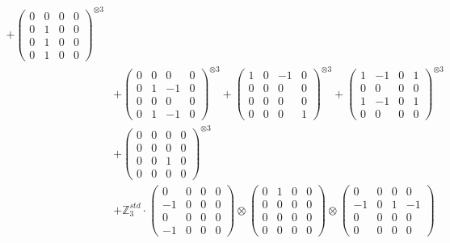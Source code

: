 \documentclass{article}
\begin{document}
{\begin{align}
            + \begin{pmatrix} 0 & 0 & 0 & 0 \\ 0 & 1 & 0 & 0 \\ 0 & 1 & 0 & 0 \\ 0 & 1 & 0 & 0 \end{pmatrix}^{\otimes 3} \\
        &+ \label{Rs13-Rc12-Solution-1-c10} \begin{pmatrix} 0 & 0 & 0 & 0 \\ 0 & 1 & -1 & 0 \\ 0 & 0 & 0 & 0 \\ 0 & 1 & -1 & 0 \end{pmatrix}^{\otimes 3} 
            + \begin{pmatrix} 1 & 0 & -1 & 0 \\ 0 & 0 & 0 & 0 \\ 0 & 0 & 0 & 0 \\ 0 & 0 & 0 & 1 \end{pmatrix}^{\otimes 3} 
            + \begin{pmatrix} 1 & -1 & 0 & 1 \\ 0 & 0 & 0 & 0 \\ 1 & -1 & 0 & 1 \\ 0 & 0 & 0 & 0 \end{pmatrix}^{\otimes 3} \\
        &+ \label{Rs13-Rc12-Solution-1-c13} \begin{pmatrix} 0 & 0 & 0 & 0 \\ 0 & 0 & 0 & 0 \\ 0 & 0 & 1 & 0 \\ 0 & 0 & 0 & 0 \end{pmatrix}^{\otimes 3} \\
        &+ \label{Rs13-Rc12-Solution-1-c14} \mathbb{Z}_3^{std} \cdot 
            \begin{pmatrix} 0 & 0 & 0 & 0 \\ -1 & 0 & 0 & 0 \\ 0 & 0 & 0 & 0 \\ -1 & 0 & 0 & 0 \end{pmatrix} \otimes 
            \begin{pmatrix} 0 & 1 & 0 & 0 \\ 0 & 0 & 0 & 0 \\ 0 & 0 & 0 & 0 \\ 0 & 0 & 0 & 0 \end{pmatrix} \otimes 
            \begin{pmatrix} 0 & 0 & 0 & 0 \\ -1 & 0 & 1 & -1 \\ 0 & 0 & 0 & 0 \\ 0 & 0 & 0 & 0 \end{pmatrix} \\ 

\end{align}}
\end{document}
